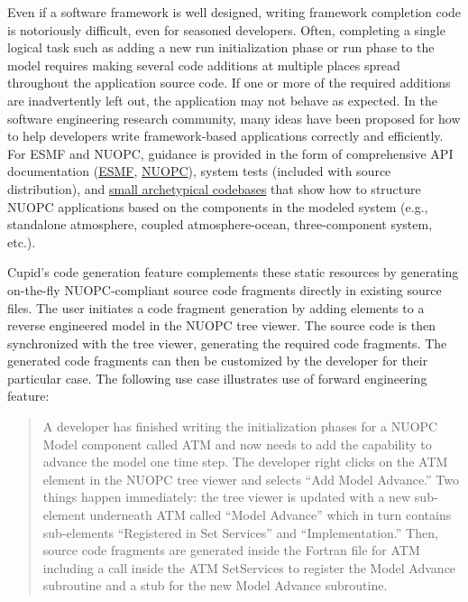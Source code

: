 \documentclass[oneside,11pt]{memoir}
\begin{document}
Even if a software framework is well designed, writing framework completion code is notoriously difficult, even for seasoned developers. Often, completing a single logical task such as adding a new run initialization phase or run phase to the model requires making several code additions at multiple places spread throughout the application source code. If one or more of the required additions are inadvertently left out, the application may not behave as expected.  
In the software engineering research community, many ideas have been proposed for how to help developers write framework-based applications correctly and efficiently. For ESMF and NUOPC, guidance is provided in the form of comprehensive API documentation (\href{http://www.earthsystemmodeling.org/esmf_releases/public/last/ESMF_refdoc/}{ESMF}, \href{https://earthsystemcog.org/projects/nuopc/refmans}{NUOPC}), system tests (included with source distribution), and \href{https://earthsystemcog.org/projects/nuopc/proto_codes}{small archetypical codebases} that show how to structure NUOPC applications based on the components in the modeled system (e.g., standalone atmosphere, coupled atmosphere-ocean, three-component system, etc.). 

Cupid's code generation feature complements these static resources by generating on-the-fly NUOPC-compliant source code fragments directly in existing source files. The user initiates a code fragment generation by adding elements to a reverse engineered model in the NUOPC tree viewer. The source code is then synchronized with the tree viewer, generating the required code fragments. The generated code fragments can then be customized by the developer for their particular case. The following use case illustrates use of forward engineering feature:

\begin{quote}
A developer has finished writing the initialization phases for a NUOPC Model component called ATM and now needs to add the capability to advance the model one time step. The developer right clicks on the ATM element in the NUOPC tree viewer and selects ``Add Model Advance.''  Two things happen immediately: the tree viewer is updated with a new sub-element underneath ATM called ``Model Advance'' which in turn contains sub-elements ``Registered in Set Services'' and ``Implementation.'' Then, source code fragments are generated inside the Fortran file for ATM including a call inside the ATM SetServices to register the Model Advance subroutine and a stub for the new Model Advance subroutine.
\end{quote}
\end{document}
